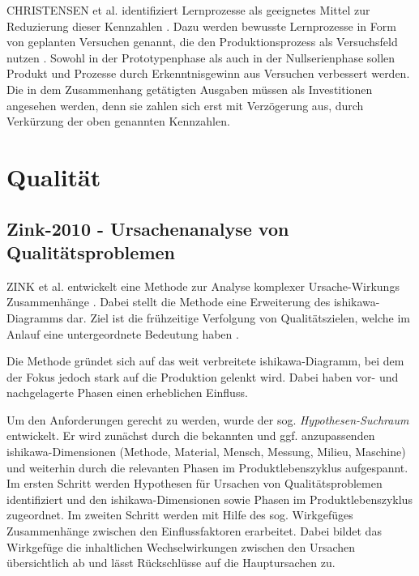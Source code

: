 CHRISTENSEN et al. identifiziert Lernprozesse als geeignetes Mittel zur Reduzierung dieser Kennzahlen \autocite{Christensen2016}.
Dazu werden bewusste Lernprozesse in Form von geplanten Versuchen genannt, die den Produktionsprozess als Versuchsfeld nutzen \autocite{Terwiesch2001}.  Sowohl in der Prototypenphase als auch in der Nullserienphase sollen Produkt und Prozesse durch Erkenntnisgewinn aus Versuchen verbessert werden. Die in dem Zusammenhang getätigten Ausgaben müssen als Investitionen angesehen werden, denn sie zahlen sich erst mit Verzögerung aus, durch Verkürzung der oben genannten Kennzahlen. 


\section{Qualität}

\subsection*{Zink-2010 - Ursachenanalyse von Qualitätsproblemen}

ZINK et al. entwickelt eine Methode zur Analyse komplexer Ursache-Wirkungs Zusammenhänge \autocite{Zink2010}. Dabei stellt die Methode eine Erweiterung des \gls{ishikawa}-Diagramms dar. Ziel ist die frühzeitige Verfolgung von Qualitätszielen, welche im Anlauf eine untergeordnete Bedeutung haben \autocite{Fleischer2003, Terwiesch2001a}. 

Die Methode gründet sich auf das weit verbreitete \gls{ishikawa}-Diagramm, bei dem der Fokus jedoch stark auf die Produktion gelenkt wird. Dabei haben vor- und nachgelagerte Phasen einen erheblichen Einfluss. 

Um den Anforderungen gerecht zu werden, wurde der sog. \textit{Hypothesen-Suchraum} entwickelt. Er wird zunächst durch die bekannten und ggf. anzupassenden \gls{ishikawa}-Dimensionen (Methode, Material, Mensch, Messung, Milieu, Maschine) und weiterhin durch die relevanten Phasen im Produktlebenszyklus aufgespannt. 
Im ersten Schritt werden Hypothesen für Ursachen von Qualitätsproblemen identifiziert und den \gls{ishikawa}-Dimensionen sowie Phasen im Produktlebenszyklus zugeordnet. 
Im zweiten Schritt werden mit Hilfe des sog. Wirkgefüges Zusammenhänge zwischen den Einflussfaktoren erarbeitet. Dabei bildet das Wirkgefüge die inhaltlichen Wechselwirkungen zwischen den Ursachen übersichtlich ab und lässt Rückschlüsse auf die Hauptursachen zu. 

